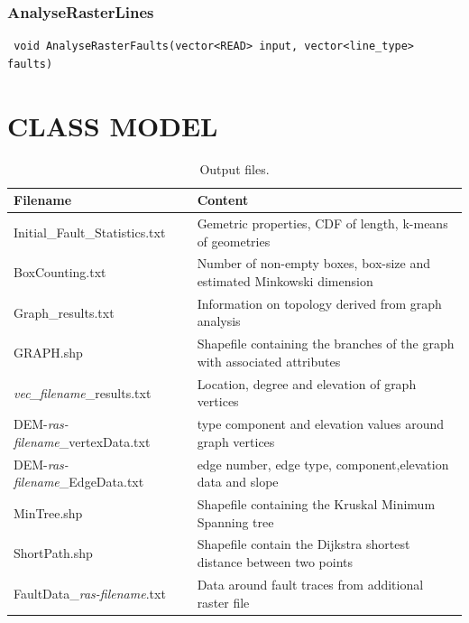 \documentclass[10pt,a4paper]{article}
\begin{document}
\subsubsection{AnalyseRasterLines}
\begin{verbatim}
 void AnalyseRasterFaults(vector<READ> input, vector<line_type> faults)
\end{verbatim}




\section{CLASS MODEL}


\begin{table}[h!]
  \begin{center}
    \caption{Output files.}
    \label{tab:table1}
    \begin{tabular}{l|l} %
      \textbf{Filename} & \textbf{Content} \\
      \hline
      Initial\_Fault\_Statistics.txt & Gemetric properties, CDF of length, k-means of geometries \\
      BoxCounting.txt & Number of non-empty boxes, box-size and estimated Minkowski dimension \\
      Graph\_results.txt &  Information on topology derived from graph analysis\\
      GRAPH.shp & Shapefile containing the branches of the graph with associated attributes  \\
      \textit{vec\_filename}\_results.txt & Location, degree and elevation of graph vertices \\
      DEM-\textit{ras-filename}\_vertexData.txt & type component and elevation values around graph vertices \\
      DEM-\textit{ras-filename}\_EdgeData.txt & edge number, edge type, component,elevation data and slope\\
      MinTree.shp & Shapefile containing the Kruskal Minimum Spanning tree \\
      ShortPath.shp & Shapefile contain the Dijkstra shortest distance between two points \\
      FaultData\_\textit{ras-filename}.txt & Data around fault traces from additional raster file \\
    \end{tabular}
  \end{center}
\end{table}
\end{document}
